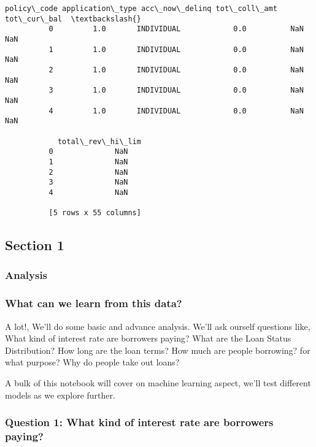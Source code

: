 \documentclass[11pt]{article}
\begin{document}
\begin{Verbatim}[commandchars=\\\{\}]
            policy\_code application\_type acc\_now\_delinq tot\_coll\_amt tot\_cur\_bal  \textbackslash{}
          0         1.0       INDIVIDUAL            0.0          NaN         NaN   
          1         1.0       INDIVIDUAL            0.0          NaN         NaN   
          2         1.0       INDIVIDUAL            0.0          NaN         NaN   
          3         1.0       INDIVIDUAL            0.0          NaN         NaN   
          4         1.0       INDIVIDUAL            0.0          NaN         NaN   
          
            total\_rev\_hi\_lim  
          0              NaN  
          1              NaN  
          2              NaN  
          3              NaN  
          4              NaN  
          
          [5 rows x 55 columns]
\end{Verbatim}
            
    \hypertarget{section-1}{%
\subsection{Section 1}\label{section-1}}

\hypertarget{analysis}{%
\subsubsection{Analysis}\label{analysis}}

    \hypertarget{what-can-we-learn-from-this-data}{%
\subsubsection{What can we learn from this
data?}\label{what-can-we-learn-from-this-data}}

A lot!, We'll do some basic and advance analysis. We'll ask ourself
questions like, What kind of interest rate are borrowers paying? What
are the Loan Status Distribution? How long are the loan terms? How much
are people borrowing? for what purpose? Why do people take out loans?

A bulk of this notebook will cover on machine learning aspect, we'll
test different models as we explore further.

    \hypertarget{question-1-what-kind-of-interest-rate-are-borrowers-paying}{%
\subsubsection{Question 1: What kind of interest rate are borrowers
paying?}\label{question-1-what-kind-of-interest-rate-are-borrowers-paying}}
\end{document}
